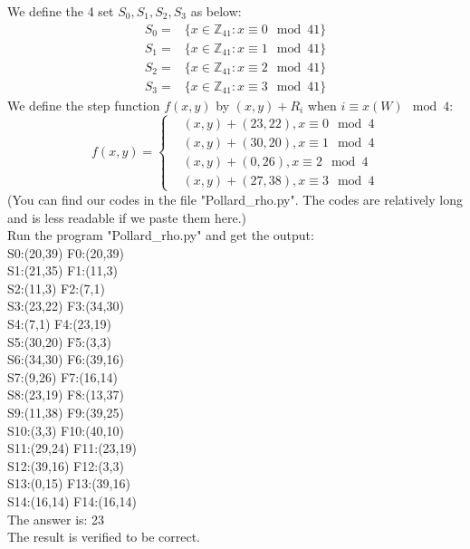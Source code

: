 \documentclass[
12pt, %
]{fphw}
\begin{document}
We define the 4 set $S_0,S_1,S_2,S_3$ as below:
\begin{align*}
	S_0=&\{x\in\mathbb{Z}_{41}:x\equiv0\mod41\}\\
	S_1=&\{x\in\mathbb{Z}_{41}:x\equiv1\mod41\}\\
	S_2=&\{x\in\mathbb{Z}_{41}:x\equiv2\mod41\}\\
	S_3=&\{x\in\mathbb{Z}_{41}:x\equiv3\mod41\}
\end{align*}
We define the step function $f(x,y)$ by $(x,y)+R_i$ when $i\equiv x(W)\mod4$:
\[ f(x,y)=\left\{
\begin{aligned}
	&(x,y)+(23,22),x\equiv0\mod4\\
	&(x,y)+(30, 20), x\equiv1\mod4 \\
	&(x,y)+(0, 26), x\equiv2\mod4\\
	&(x,y)+(27, 38), x\equiv3\mod4
\end{aligned}
\right.
\]
(You can find our codes in the file "Pollard\_rho.py". The codes are relatively long and is less readable if we paste them here.)\\
Run the program "Pollard\_rho.py" and get the output:\\
S0:(20,39) F0:(20,39) \\
S1:(21,35) F1:(11,3) \\
S2:(11,3) F2:(7,1)\\
S3:(23,22) F3:(34,30)\\
S4:(7,1) F4:(23,19)\\
S5:(30,20) F5:(3,3)\\
S6:(34,30) F6:(39,16)\\
S7:(9,26) F7:(16,14)\\
S8:(23,19) F8:(13,37)\\
S9:(11,38) F9:(39,25)\\
S10:(3,3) F10:(40,10)\\
S11:(29,24) F11:(23,19)\\
S12:(39,16) F12:(3,3)\\
S13:(0,15) F13:(39,16)\\
S14:(16,14) F14:(16,14)\\
The answer is: 23\\
The result is verified to be correct.
\end{document}
